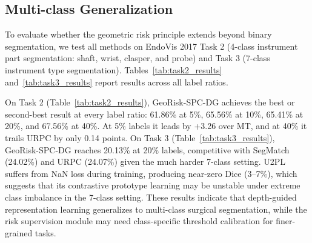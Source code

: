 \documentclass[journal]{IEEEtran}
\begin{document}
\subsection{Multi-class Generalization}
To evaluate whether the geometric risk principle extends beyond binary segmentation, we test all methods on EndoVis 2017 Task 2 (4-class instrument part segmentation: shaft, wrist, clasper, and probe) and Task 3 (7-class instrument type segmentation). Tables~\ref{tab:task2_results} and~\ref{tab:task3_results} report results across all label ratios.

On Task 2 (Table~\ref{tab:task2_results}), GeoRisk-SPC-DG achieves the best or second-best result at every label ratio: 61.86\% at 5\%, 65.56\% at 10\%, 65.41\% at 20\%, and 67.56\% at 40\%. At 5\% labels it leads by +3.26 over MT, and at 40\% it trails URPC by only 0.14 points. On Task 3 (Table~\ref{tab:task3_results}), GeoRisk-SPC-DG reaches 20.13\% at 20\% labels, competitive with SegMatch (24.02\%) and URPC (24.07\%) given the much harder 7-class setting. U2PL suffers from NaN loss during training, producing near-zero Dice (3--7\%), which suggests that its contrastive prototype learning may be unstable under extreme class imbalance in the 7-class setting. These results indicate that depth-guided representation learning generalizes to multi-class surgical segmentation, while the risk supervision module may need class-specific threshold calibration for finer-grained tasks.
\end{document}
